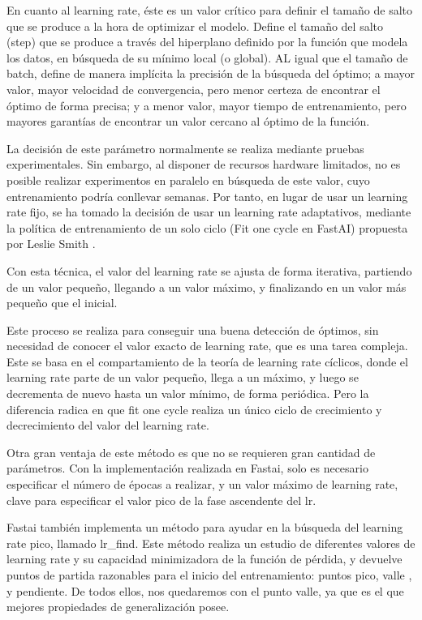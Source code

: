 En cuanto al learning rate, éste es un valor crítico para definir el tamaño de salto que se produce a la hora de optimizar el modelo. Define el tamaño del salto (step) que se produce a través del hiperplano definido por la función que modela los datos, en búsqueda de su mínimo local (o global). AL igual que el tamaño de batch, define de manera implícita la precisión de la búsqueda del óptimo; a mayor valor, mayor velocidad de convergencia, pero menor certeza de encontrar el óptimo de forma precisa; y a menor valor, mayor tiempo de entrenamiento, pero mayores garantías de encontrar un valor cercano al óptimo de la función.

La decisión de este parámetro normalmente se realiza mediante pruebas experimentales. Sin embargo, al disponer de recursos hardware limitados, no es posible realizar experimentos en paralelo en búsqueda de este valor, cuyo entrenamiento podría conllevar semanas. Por tanto, en lugar de usar un learning rate fijo, se ha tomado la decisión de usar un learning rate adaptativos, mediante la política de entrenamiento de un solo ciclo (Fit one cycle en FastAI) propuesta por Leslie Smith \cite{smith2018disciplined}.

Con esta técnica, el valor del learning rate se ajusta de forma iterativa, partiendo de un valor pequeño, llegando a un valor máximo, y finalizando en un valor más pequeño que el inicial.

Este proceso se realiza para conseguir una buena detección de óptimos, sin necesidad de conocer el valor exacto de learning rate, que es una tarea compleja. Este se basa en el compartamiento de la teoría de learning rate cíclicos, donde el learning rate parte de un valor pequeño, llega a un máximo, y luego se decrementa de nuevo hasta un valor mínimo, de forma periódica. Pero la diferencia radica en que fit one cycle realiza un único ciclo de crecimiento y decrecimiento del valor del learning rate.

Otra gran ventaja de este método es que no se requieren gran cantidad de parámetros. Con la implementación realizada en Fastai, solo es necesario especificar el número de épocas a realizar, y un valor máximo de learning rate, clave para especificar el valor pico de la fase ascendente del lr.

Fastai también implementa un método para ayudar en la búsqueda del learning rate pico, llamado lr\_find. Este método realiza un estudio de diferentes valores de learning rate y su capacidad minimizadora de la función de pérdida, y devuelve puntos de partida razonables para el inicio del entrenamiento: puntos pico, valle , y pendiente. De todos ellos, nos quedaremos con el punto valle, ya que es el que mejores propiedades de generalización posee.\\

